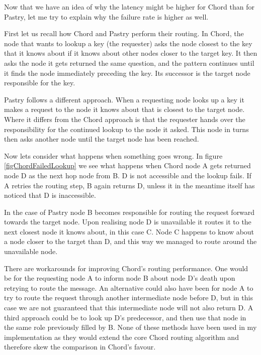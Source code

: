 \mbox{}
Now that we have an idea of why the latency might be higher for Chord than for Pastry, let me try to explain why the failure rate is higher as well.

First let us recall how Chord and Pastry perform their routing.
In Chord, the node that wants to lookup a key (the requester) asks the node closest to the key that it knows about if it knows about other nodes closer to the target key. It then asks the node it gets returned the same question, and the pattern continues until it finds the node immediately preceding the key. Its successor is the target node responsible for the key.

Pastry follows a different approach. When a requesting node looks up a key it makes a request to the node it knows about that is closest to the target node. Where it differs from the Chord approach is that the requester hands over the responsibility for the continued lookup to the node it asked. This node in turns then asks another node until the target node has been reached.

Now lets consider what happens when something goes wrong.
In figure \ref{figChordFailedLookup} we see what happens when Chord node A gets returned node D as the next hop node from B. D is not accessible and the lookup fails. If A retries the routing step, B again returns D, unless it in the meantime itself has noticed that D is inaccessible.

In the case of Pastry node B becomes responsible for routing the request forward towards the target node. Upon realising node D is unavailable it routes it to the next closest node it knows about, in this case C. Node C happens to know about a node closer to the target than D, and this way we managed to route around the unavailable node.

There are workarounds for improving Chord's routing performance. One would be for the requesting node A to inform node B about node D's death upon retrying to route the message. An alternative could also have been for node A to try to route the request through another intermediate node before D, but in this case we are not guaranteed that this intermediate node will not also return D.
A third approach could be to look up D's predecessor, and then use that node in the same role previously filled by B. None of these methods have been used in my implementation as they would extend the core Chord routing algorithm and therefore skew the comparison in Chord's favour.

